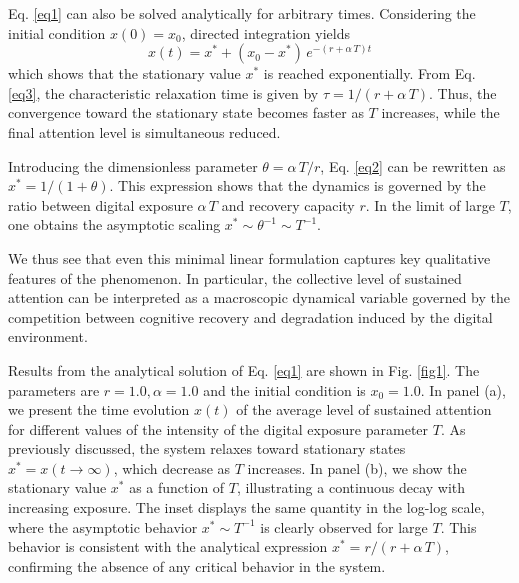 \documentclass[preprint,12pt]{elsarticle}
\begin{document}
Eq. \eqref{eq1} can also be solved analytically for arbitrary times. Considering the initial condition $x(0)=x_0$, directed integration yields
\begin{equation}  \label{eq3}
x(t) = x^* + (x_0 - x^*)\,e^{-(r+\alpha\,T)t}
\end{equation}
\noindent
which shows that the stationary value $x^*$ is reached exponentially. From Eq. \eqref{eq3}, the characteristic relaxation time is given by $\tau=1/(r+\alpha\,T)$. Thus, the convergence toward the stationary state becomes faster as $T$ increases, while the final attention level is simultaneous reduced. 

Introducing the dimensionless parameter $\theta=\alpha\,T/r$, Eq. \eqref{eq2} can be rewritten as $x^*=1/(1+\theta)$. This expression shows that the dynamics is governed by the ratio between digital exposure $\alpha\,T$ and recovery capacity $r$. In the limit of large $T$, one obtains the asymptotic scaling $x^*\sim \theta^{-1}\sim T^{-1}$.

We thus see that even this minimal linear formulation captures key qualitative features of the phenomenon. In particular, the collective level of sustained attention can be interpreted as a macroscopic dynamical variable governed by the competition between cognitive recovery and degradation induced by the digital environment.

Results from the analytical solution of Eq. \eqref{eq1} are shown in Fig. \ref{fig1}. The parameters are $r=1.0, \alpha=1.0$ and the initial condition is $x_0=1.0$. In panel (a), we present the time evolution $x(t)$ of the average level of sustained attention for different values of the intensity of the digital exposure parameter $T$. As previously discussed, the system relaxes toward stationary states $x^*=x(t\to\infty)$, which decrease as $T$ increases. In panel (b), we show the stationary value $x^*$ as a function of $T$, illustrating a continuous decay with increasing exposure. The inset displays the same quantity in the log-log scale, where the asymptotic behavior $x^*\sim T^{-1}$ is clearly observed for large $T$. This behavior is consistent with the analytical expression $x^{*} = r/(r + \alpha\,T)$,  confirming the absence of any critical behavior in the system.
\end{document}
